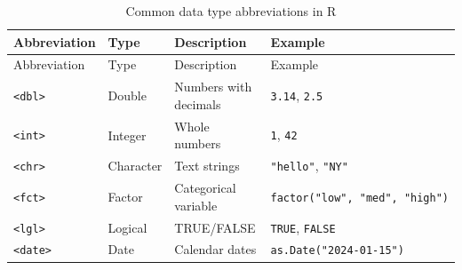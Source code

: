 \documentclass[
  letterpaper,
  DIV=11,
  numbers=noendperiod]{scrreprt}
\begin{document}
\begin{longtable}[]{@{}
  >{\raggedright\arraybackslash}p{}
  >{\raggedright\arraybackslash}p{}
  >{\raggedright\arraybackslash}p{}
  >{\raggedright\arraybackslash}p{}@{}}
\caption{Common data type abbreviations in
R}\label{tbl-type-abbrev}\tabularnewline
\toprule\noalign{}
\begin{minipage}[b]{\linewidth}\raggedright
Abbreviation
\end{minipage} & \begin{minipage}[b]{\linewidth}\raggedright
Type
\end{minipage} & \begin{minipage}[b]{\linewidth}\raggedright
Description
\end{minipage} & \begin{minipage}[b]{\linewidth}\raggedright
Example
\end{minipage} \\
\midrule\noalign{}
\endfirsthead
\toprule\noalign{}
\begin{minipage}[b]{\linewidth}\raggedright
Abbreviation
\end{minipage} & \begin{minipage}[b]{\linewidth}\raggedright
Type
\end{minipage} & \begin{minipage}[b]{\linewidth}\raggedright
Description
\end{minipage} & \begin{minipage}[b]{\linewidth}\raggedright
Example
\end{minipage} \\
\midrule\noalign{}
\endhead
\bottomrule\noalign{}
\endlastfoot
\texttt{\textless{}dbl\textgreater{}} & Double & Numbers with decimals &
\texttt{3.14}, \texttt{2.5} \\
\texttt{\textless{}int\textgreater{}} & Integer & Whole numbers &
\texttt{1}, \texttt{42} \\
\texttt{\textless{}chr\textgreater{}} & Character & Text strings &
\texttt{"hello"}, \texttt{"NY"} \\
\texttt{\textless{}fct\textgreater{}} & Factor & Categorical variable &
\texttt{factor("low",\ "med",\ "high")} \\
\texttt{\textless{}lgl\textgreater{}} & Logical & TRUE/FALSE &
\texttt{TRUE}, \texttt{FALSE} \\
\texttt{\textless{}date\textgreater{}} & Date & Calendar dates &
\texttt{as.Date("2024-01-15")} \\
\end{longtable}
\end{document}
